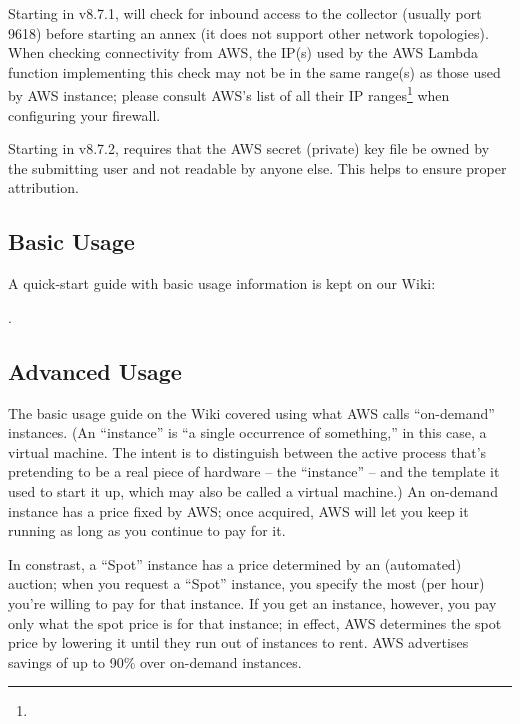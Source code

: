 Starting in v8.7.1,  will check for inbound access to the
collector (usually port 9618) before starting an annex (it does not
support other network topologies).  When checking connectivity
from AWS, the IP(s) used by the AWS Lambda function implementing this check
may not be in the same range(s) as those used by AWS instance; please
consult AWS's list of all their IP
ranges\footnote{}
when configuring your firewall.

Starting in v8.7.2,  requires that the AWS secret (private) key file
be owned by the submitting user and not readable by anyone else.  This
helps to ensure proper attribution.

\subsection{Basic Usage}

A quick-start guide with basic usage information is kept on our Wiki:


.

\subsection{Advanced Usage}

The basic usage guide on the Wiki covered using what AWS calls ``on-demand''
instances.  (An ``instance'' is ``a single occurrence of something,'' in
this case, a virtual machine.  The intent is to distinguish between the
active process that's pretending to be a real piece of hardware --
the ``instance'' -- and the template it used to start it up, which may also
be called a virtual machine.)  An on-demand instance has a price fixed by AWS;
once acquired, AWS will let you keep it running as long as you continue to
pay for it.

In constrast, a ``Spot'' instance has a price determined by an (automated)
auction; when you request a ``Spot'' instance, you specify the most (per hour)
you're willing to pay for that instance.  If you get an instance, however,
you pay only what the spot price is for that instance; in effect, AWS
determines the spot price by lowering it until they run out of instances
to rent.  AWS advertises savings of up to 90\% over on-demand instances.


